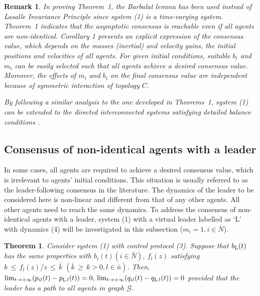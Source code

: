 \documentclass{cta-author}
\newtheorem{theorem}{Theorem}{}
\newtheorem{remark}{Remark}{}
\begin{document}
\begin{remark}\label{rem2}
In proving Theorem~1, the Barbalat lemma
has been used instead of Lasalle Invariance Principle since system
(1) is a time-varying system. Theorem~1 indicates that the asymptotic
consensus is reachable even if all agents are non-identical.
Corollary 1 presents an explicit expression of the consensus value,
which depends on the masses (inertial) and velocity gains, the
initial positions and velocities of all agents. For given initial
conditions, suitable $b_{i}$ and $m_{i}$ can be easily selected
such that all agents achieve a desired consensus value. Moreover,
the effects of $m_{i}$ and $b_{i}$ on the final consensus value are
independent because of symmetric interaction of topology $C$.

By following a similar analysis to the one developed in Theorems~1, system (1) can be extended
to the directed interconnected systems satisfying detailed balance conditions .
\end{remark}

\subsection{Consensus of non-identical agents with a leader}\label{subsec3.2}

In some cases, all agents are required to achieve a desired
consensus value, which is irrelevant to agents' initial conditions.
This situation is usually referred to as the \hbox{leader-following}
consensus in the literature. The dynamics of the leader to be
considered here is non-linear and different from that of any other
agents. All other agents need to reach the same dynamics. To address
the consensus of non-identical agents with a leader, system (1) with
a virtual leader labelled as `L' with dynamics (4) will be
investigated in this subsection ($m_{i}=1, i\in\bar{N}$).
\begin{theorem}\label{thm2}
Consider system (1) with control
protocol (3). Suppose that $b_{\rm L}(t)$ has the same properties with
$b_{i}(t)(i\in\bar{N})$, $f_{l}(z)$ satisfying $
k\,{\leq}\,{f_{l}(z)}/{z}\,{\leq}\,\bar{k}$ $(\bar{k}\,{\geq}\,
k>0, l\in\bar{n})$. Then, $\lim_{t\rightarrow +\infty}
(p_{il}(t)-p_{{\rm L}\,l}(t))=0,\,\lim_{t\rightarrow
+\infty}(q_{il}(t)-q_{{\rm L}\,l}(t))=0$ provided that the leader has a path to all agents in graph $\mathcal{G}$.
\end{theorem}
\end{document}
